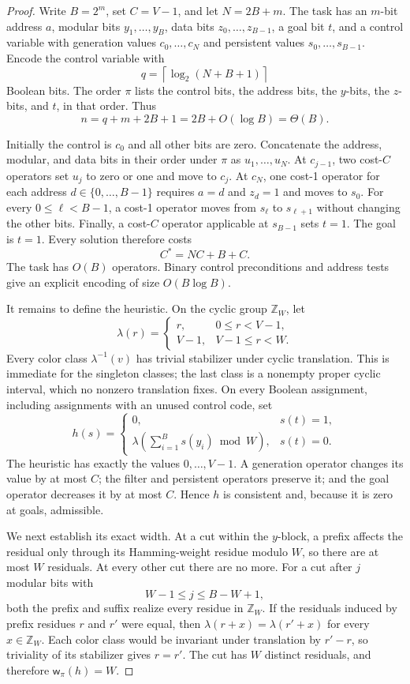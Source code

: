 \documentclass[letterpaper]{article}
\newcommand{\copt}{\ensuremath{C^{*}}}
\newcommand{\width}{\ensuremath{\mathsf{w}}}
\newcommand{\values}{\ensuremath{V}}
\theoremstyle{plain}
\theoremstyle{definition}
\theoremstyle{remark}
\begin{document}
\begin{proof}
Write $B=2^m$, set $C=\values-1$, and let $N=2B+m$.  The task has an
$m$-bit address $a$, modular bits $y_1,\ldots,y_B$, data bits
$z_0,\ldots,z_{B-1}$, a goal bit $t$, and a control variable with generation
values $c_0,\ldots,c_N$ and persistent values $s_0,\ldots,s_{B-1}$.  Encode
the control variable with
\[
 q=\left\lceil\log_2(N+B+1)\right\rceil
\]
Boolean bits.  The order $\pi$ lists the control bits, the address bits, the
$y$-bits, the $z$-bits, and $t$, in that order.  Thus
\[
 n=q+m+2B+1=2B+O(\log B)=\Theta(B).
\]

Initially the control is $c_0$ and all other bits are zero.  Concatenate the
address, modular, and data bits in their order under $\pi$ as
$u_1,\ldots,u_N$.  At $c_{j-1}$, two cost-$C$ operators set $u_j$ to zero or
one and move to $c_j$.  At $c_N$, one cost-1 operator for each address
$d\in\{0,\ldots,B-1\}$ requires $a=d$ and $z_d=1$ and moves to $s_0$.
For every $0\leq\ell<B-1$, a cost-1 operator moves from $s_\ell$ to
$s_{\ell+1}$ without changing the other bits.  Finally, a cost-$C$ operator
applicable at $s_{B-1}$ sets $t=1$.
The goal is $t=1$.  Every solution therefore costs
\[
 \copt=NC+B+C.
\]
The task has $O(B)$ operators.  Binary control preconditions and address
tests give an explicit encoding of size $O(B\log B)$.

It remains to define the heuristic.  On the cyclic group $\mathbb Z_W$, let
\[
 \lambda(r)=
 \begin{cases}
   r, & 0\leq r<\values-1,\\
   \values-1, & \values-1\leq r<W.
 \end{cases}
\]
Every color class $\lambda^{-1}(v)$ has trivial stabilizer under cyclic
translation.  This is immediate for the singleton classes; the last class is
a nonempty proper cyclic interval, which no nonzero translation fixes.  On
every Boolean assignment, including assignments with an unused control code,
set
\[
 h(s)=
 \begin{cases}
   0, & s(t)=1,\\
   \lambda\!\left(\sum_{i=1}^B s(y_i)\bmod W\right), & s(t)=0.
 \end{cases}
\]
The heuristic has exactly the values $0,\ldots,\values-1$.  A generation
operator changes its value by at most $C$; the filter and persistent operators
preserve it; and the goal operator decreases it by at most $C$.  Hence $h$ is
consistent and, because it is zero at goals, admissible.

We next establish its exact width.  At a cut within the $y$-block, a prefix
affects the residual only through its Hamming-weight residue modulo $W$, so
there are at most $W$ residuals.  At every other cut there are no more.  For a
cut after $j$ modular bits with
\[
 W-1\leq j\leq B-W+1,
\]
both the prefix and suffix realize every residue in $\mathbb Z_W$.  If the
residuals induced by prefix residues $r$ and $r'$ were equal, then
$\lambda(r+x)=\lambda(r'+x)$ for every $x\in\mathbb Z_W$.  Each color class
would be invariant under translation by $r'-r$, so triviality of its
stabilizer gives $r=r'$.  The cut has $W$ distinct residuals, and therefore
$\width_\pi(h)=W$.


\end{proof}
\end{document}

